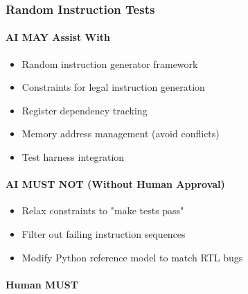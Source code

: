 \subsubsection{Random Instruction Tests}\label{cr:status:phase1-ai-human-responsibilities:random-instruction-tests}

\paragraph{\texorpdfstring{\ok{} AI MAY Assist
With}{ AI MAY Assist With}}\label{cr:status:phase1-ai-human-responsibilities:white-check-mark-ai-may-assist-with-12}

\begin{record}

\begin{itemize}
\tightlist
\item
  Random instruction generator framework
\item
  Constraints for legal instruction generation
\item
  Register dependency tracking
\item
  Memory address management (avoid conflicts)
\item
  Test harness integration
\end{itemize}

\end{record}

\paragraph{\texorpdfstring{\warn{} AI MUST NOT (Without Human
Approval)}{ AI MUST NOT (Without Human Approval)}}\label{cr:status:phase1-ai-human-responsibilities:warning-ai-must-not-without-human-approval-12}

\begin{record}

\begin{itemize}
\tightlist
\item
  Relax constraints to "make tests pass"
\item
  Filter out failing instruction sequences
\item
  Modify Python reference model to match RTL bugs
\end{itemize}

\end{record}

\paragraph{\texorpdfstring{\hold{} Human MUST}{ Human MUST}}\label{cr:status:phase1-ai-human-responsibilities:raised-hand-human-must-12}

